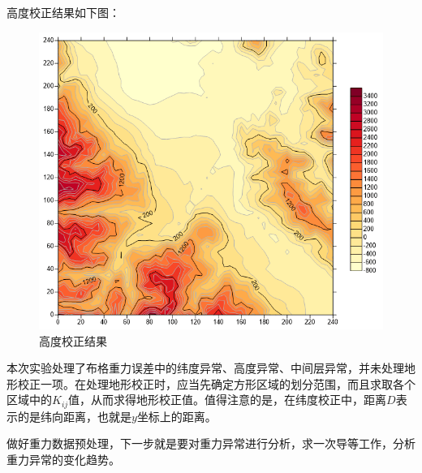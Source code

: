 高度校正结果如下图：
\begin{figure}[H]
	\centering
	\includegraphics[scale = 0.85]{figures/g_h.png}
	\caption{高度校正结果}
\end{figure}

本次实验处理了布格重力误差中的纬度异常、高度异常、中间层异常，并未处理地形校正一项。在处理地形校正时，应当先确定方形区域的划分范围，而且求取各个区域中的$K_{ij}$值，从而求得地形校正值。值得注意的是，在纬度校正中，距离$D$表示的是纬向距离，也就是$y$坐标上的距离。

做好重力数据预处理，下一步就是要对重力异常进行分析，求一次导等工作，分析重力异常的变化趋势。